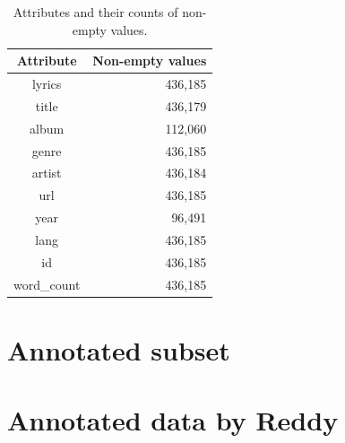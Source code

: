 \begin{table}[h!]
	\centering
	\begin{tabular}{| c | r |} 
		\hline
		Attribute & Non-empty values \\ [0.5ex] 
		\hline
		lyrics & 436,185 \\
		title & 436,179 \\
		album & 112,060 \\
		genre & 436,185 \\ 
		artist & 436,184 \\ 
		url & 436,185 \\
		year & 96,491 \\ 
		lang & 436,185 \\
		id & 436,185 \\
		word\_count & 436,185 \\
		\hline
	\end{tabular}
	\caption{Attributes and their counts of non-empty values.}
	\label{stats_nonempty_values}
\end{table}

\section{Annotated subset}

\section{Annotated data by Reddy}
